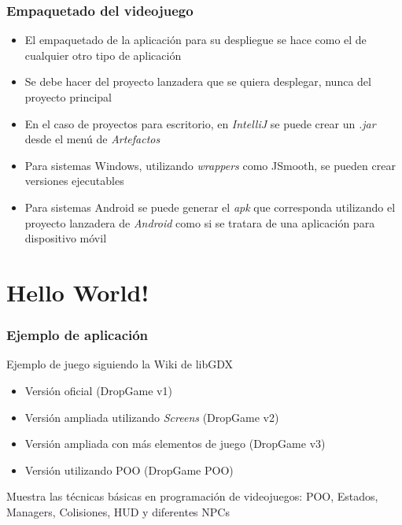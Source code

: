 \documentclass[xcolor={dvipsnames}]{beamer}
\begin{document}
\begin{frame}\frametitle{Empaquetado del videojuego}
    \begin{block}{}
    \begin{itemize}
        \item El empaquetado de la aplicación para su despliegue se hace como el de cualquier otro tipo de aplicación
        \item Se debe hacer del proyecto lanzadera que se quiera desplegar, nunca del proyecto principal
        \item En el caso de proyectos para escritorio, en \emph{IntelliJ} se puede crear un \emph{.jar} desde el menú de \emph{Artefactos}
        \item Para sistemas Windows, utilizando \emph{wrappers} como \textcolor{resalta}{JSmooth}, se pueden crear versiones ejecutables
        \item Para sistemas Android se puede generar el \emph{apk} que corresponda utilizando el proyecto lanzadera de \emph{Android} como si se tratara de una aplicación para dispositivo móvil
    \end{itemize}
    \end{block}
\end{frame}

\section{Hello World!}
\begin{frame}\frametitle{Ejemplo de aplicación}
    \begin{block}{Ejemplo de juego siguiendo la Wiki de \textcolor{resalta}{libGDX}}
    \begin{itemize}
        \item Versión oficial (DropGame v1) \href{https://bitbucket.org/sfaci/java-libgdx/downloads/DropGame_v1.zip}{}
        \item Versión ampliada utilizando \emph{Screens} (DropGame v2)
        \href{https://bitbucket.org/sfaci/java-libgdx/downloads/DropGame_v2.zip}{}
        \item Versión ampliada con más elementos de juego (DropGame v3) \href{https://bitbucket.org/sfaci/java-libgdx/downloads/DropGame_v3.zip}{}
        \item Versión utilizando POO (DropGame POO) \href{https://bitbucket.org/sfaci/java-libgdx/downloads/DropGame_POO.zip}{}
    \end{itemize}
    \end{block}
    Muestra las técnicas básicas en programación de videojuegos: POO, Estados, Managers, Colisiones, HUD y diferentes NPCs
\end{frame}
\end{document}
